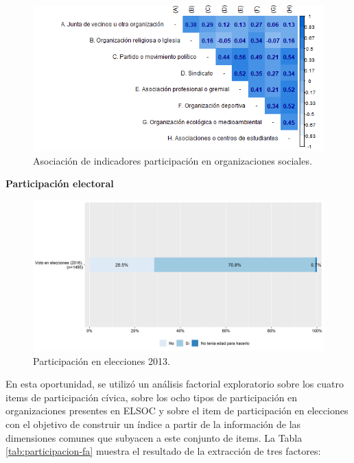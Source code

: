 \documentclass[
  12pt,
]{book}
\begin{document}
\begin{figure}[H]

{\centering \includegraphics[width=1\linewidth,height=1\textheight]{output/graphs/participacion-organizaciones_cor} 

}

\caption{Asociación de indicadores participación en organizaciones sociales.}\label{fig:participacion-organizaciones-cor}
\end{figure}

\textbf{Participación electoral}

\begin{figure}[H]

{\centering \includegraphics[width=1\linewidth,height=1\textheight]{output/graphs/participacion-electoral} 

}

\caption{Participación en elecciones 2013.}\label{fig:participacion-electoral}
\end{figure}

En esta oportunidad, se utilizó un análisis factorial exploratorio sobre los cuatro items de participación cívica, sobre los ocho tipos de participación en organizaciones presentes en ELSOC y sobre el item de participación en elecciones con el objetivo de construir un índice a partir de la información de las dimensiones comunes que subyacen a este conjunto de items. La Tabla \ref{tab:participacion-fa} muestra el resultado de la extracción de tres factores:
\end{document}
